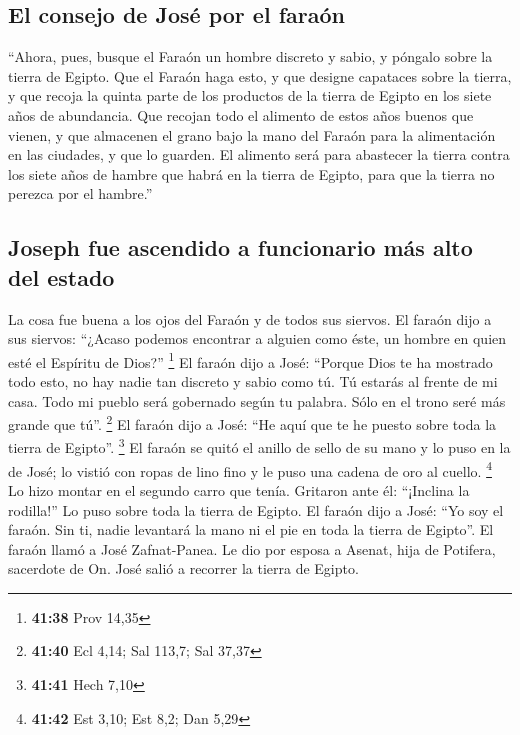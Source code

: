 \hypertarget{el-consejo-de-josuxe9-por-el-farauxf3n}{%
\subsection{El consejo de José por el
faraón}\label{el-consejo-de-josuxe9-por-el-farauxf3n}}

 ``Ahora, pues, busque el Faraón un hombre discreto y
sabio, y póngalo sobre la tierra de Egipto.  Que el
Faraón haga esto, y que designe capataces sobre la tierra, y que recoja
la quinta parte de los productos de la tierra de Egipto en los siete
años de abundancia.  Que recojan todo el alimento de
estos años buenos que vienen, y que almacenen el grano bajo la mano del
Faraón para la alimentación en las ciudades, y que lo guarden.
 El alimento será para abastecer la tierra contra los
siete años de hambre que habrá en la tierra de Egipto, para que la
tierra no perezca por el hambre.''

\hypertarget{joseph-fue-ascendido-a-funcionario-muxe1s-alto-del-estado}{%
\subsection{Joseph fue ascendido a funcionario más alto del
estado}\label{joseph-fue-ascendido-a-funcionario-muxe1s-alto-del-estado}}

 La cosa fue buena a los ojos del Faraón y de todos sus
siervos.  El faraón dijo a sus siervos: ``¿Acaso podemos
encontrar a alguien como éste, un hombre en quien esté el Espíritu de
Dios?'' \footnote{\textbf{41:38} Prov 14,35}  El faraón
dijo a José: ``Porque Dios te ha mostrado todo esto, no hay nadie tan
discreto y sabio como tú.  Tú estarás al frente de mi
casa. Todo mi pueblo será gobernado según tu palabra. Sólo en el trono
seré más grande que tú''. \footnote{\textbf{41:40} Ecl 4,14; Sal 113,7;
  Sal 37,37}  El faraón dijo a José: ``He aquí que te he
puesto sobre toda la tierra de Egipto''. \footnote{\textbf{41:41} Hech
  7,10}  El faraón se quitó el anillo de sello de su mano
y lo puso en la de José; lo vistió con ropas de lino fino y le puso una
cadena de oro al cuello. \footnote{\textbf{41:42} Est 3,10; Est 8,2; Dan
  5,29}  Lo hizo montar en el segundo carro que tenía.
Gritaron ante él: ``¡Inclina la rodilla!'' Lo puso sobre toda la tierra
de Egipto.  El faraón dijo a José: ``Yo soy el faraón.
Sin ti, nadie levantará la mano ni el pie en toda la tierra de Egipto''.
 El faraón llamó a José Zafnat-Panea. Le dio por esposa a
Asenat, hija de Potifera, sacerdote de On. José salió a recorrer la
tierra de Egipto.

